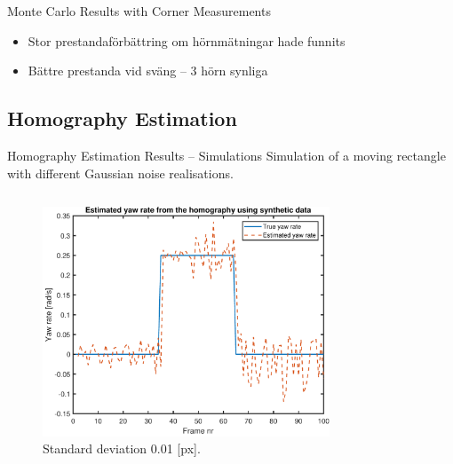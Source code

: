 \documentclass{beamer}
\renewcommand{\aa}{\"a\xspace}
\renewcommand{\o}{\"o\xspace}
\begin{document}
\begin{frame}{Monte Carlo Results with Corner Measurements}
	\note
	{
		\begin{itemize}
			\item Stor prestandaf\o{}rb\aa{}ttring om h\o{}rnm\aa{}tningar hade funnits
			\item B\aa{}ttre prestanda vid sv\aa{}ng -- 3 h\o{}rn synliga
		\end{itemize}
	}
\end{frame}

\subsection{Homography Estimation}

\begin{frame}{Homography Estimation Results -- Simulations}
	Simulation of a moving rectangle with different Gaussian noise realisations.
	\vspace{-2.5em}
	\begin{columns}[T]
	\begin{figure}
		\includegraphics[height=0.375\textheight]{Hom/rect_1e-2}
		\vspace{-1.25em}
		\caption{Standard deviation 0.01 [px].}
	\end{figure}
	\vspace{-2.5em}
	\begin{figure}

\end{figure}
\end{columns}
\end{frame}
\end{document}
